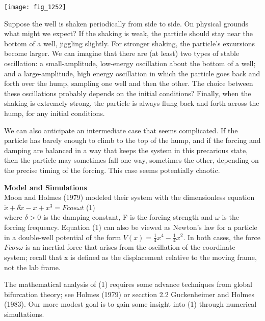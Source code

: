 \documentclass{article}
\newcommand\tab[1][1cm]{\hspace*{#1}}
\begin{document}
\texttt{[image: fig\_1252]}

Suppose the well is shaken periodically from side to side. On physical grounds what might we expect? If the shaking is weak, the particle should stay near the bottom of a well, jiggling slightly. For stronger shaking, the particle's excursions become larger. We can imagine that there are (at least) two types of stable oscillation: a small-amplitude, low-energy oscillation about the bottom of a well; and a large-amplitude, high energy oscillation in which the particle goes back and forth over the hump, sampling one well and then the other. The choice between these oscillations probably depends on the initial conditions? Finally, when the shaking is extremely strong, the particle is always flung back and forth across the hump, for any initial conditions. \\ \tab

We can also anticipate an intermediate case that seems complicated. If the particle has barely enough to climb to the top of the hump, and if the forcing and damping are balanced in a way that keeps the system in this precarious state, then the particle may sometimes fall one way, sometimes the other, depending on the precise timing of the forcing. This case seems potentially chaotic. \\ \tab

\textbf {Model and Simulations} \\

Moon and Holmes (1979) modeled their system with the dimensionless equation \\

$\ddot{x}+\delta \dot{x} - x + x^{3} = F cos \omega t$ \tab (1) \\

where $\delta > 0$ is the damping constant, F is the forcing strength and $\omega$ is the forcing frequency. Equation (1) can also be viewed as Newton's law for a particle in a double-well potential of the form $V(x)= \frac{1}{4}x^{4}-\frac{1}{4}x^{2}$. In both cases, the force $Fcos \omega$ is an inertial force that arises from the oscillation of the coordinate system; recall that x is defined as the displacement relative to the moving frame, not the lab frame. \\ \tab

The mathematical analysis of (1) requires some advance techniques from global bifurcation theory; see Holmes (1979) or secction 2.2 Guckenheimer and Holmes (1983). Our more modest goal is to gain some insight into (1) through numerical simultations. \\ \tab
\end{document}
